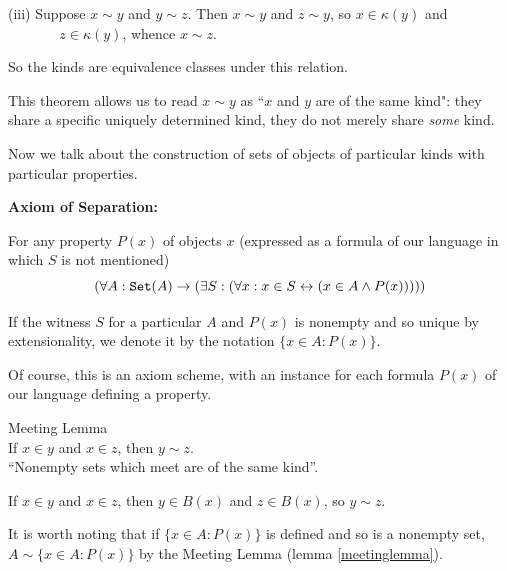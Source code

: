 \documentclass[12pt]{article}
\begin{document}
(iii)
Suppose $x \sim y$ and $y \sim z$.  Then $x \sim y$ and $z \sim y$, so
$x \in \kappa(y)$ and\\ \mbox{\, \, \, \, \, } $z \in \kappa(y)$, whence $x \sim z$.

\endproof

So the kinds are equivalence classes under this relation.

This theorem allows us to read $x \sim y$ as ``$x$ and $y$ are of the same kind":  they share a specific uniquely determined kind, they do not merely share {\sl some} kind.


Now we talk about the construction of sets of objects of particular kinds with particular properties.

\smallskip

{\bf Axiom of Separation:}

\smallskip

For any property $P(x)$ of objects $x$ (expressed as a formula of our
language in which $S$ is not mentioned) $$(\forall A:{\tt Set}(A)
\rightarrow (\exists S:(\forall x:x \in S \leftrightarrow (x \in A
\wedge P(x)))))$$

If the witness $S$ for a particular $A$ and $P(x)$ is nonempty and so unique
by extensionality, we denote it by the notation $\{x \in A:P(x)\}$.





Of course, this is an axiom scheme, with an instance for each formula $P(x)$ of our language defining a property.

\begin{lem}\label{meetinglemma} Meeting Lemma
\mbox{\negthinspace}\\
  If $x \in y$ and $x \in z$, then $y \sim z$.\\
  ``Nonempty sets which meet are of the same kind''.\end{lem}

\Proof

If $x \in y$ and $x \in z$, then $y \in B(x)$ and $z \in B(x)$, so $y \sim z$.

\endproof

It is worth noting that if $\{x \in A:P(x)\}$ is defined and so is a nonempty set, $A \sim \{x \in A:P(x)\}$ by the Meeting Lemma (lemma \ref{meetinglemma}).

\end{document}
